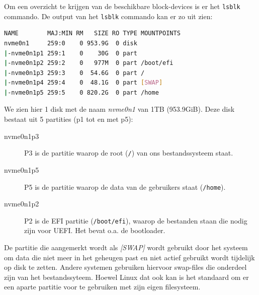 Om een overzicht te krijgen van de beschikbare block-devices is er het \texttt{lsblk} commando. De output van het \texttt{lsblk} commando kan er zo uit zien:
\begin{lstlisting}[language=bash]
NAME        MAJ:MIN RM   SIZE RO TYPE MOUNTPOINTS
nvme0n1     259:0    0 953.9G  0 disk 
|-nvme0n1p1 259:1    0    30G  0 part 
|-nvme0n1p2 259:2    0   977M  0 part /boot/efi
|-nvme0n1p3 259:3    0  54.6G  0 part /
|-nvme0n1p4 259:4    0  48.1G  0 part [SWAP]
|-nvme0n1p5 259:5    0 820.2G  0 part /home
\end{lstlisting}
We zien hier 1 disk met de naam \textit{nvme0n1} van 1TB (953.9GiB). Deze disk bestaat uit 5 partities (p1 tot en met p5):
\begin{description}
\item[nvme0n1p3] P3 is de partitie waarop de root (\texttt{/}) van ons bestandssysteem staat.
\item[nvme0n1p5] P5 is de partitie waarop de data van de gebruikers staat (\texttt{/home}).
\item[nvme0n1p2] P2 is de EFI partitie (\texttt{/boot/efi}), waarop de bestanden staan die nodig zijn voor UEFI. Het bevat o.a. de bootloader.
\end{description}

De partitie die aangemerkt wordt als \textit{[SWAP]} wordt gebruikt door het systeem om data die niet meer in het geheugen past en niet actief gebruikt wordt tijdelijk op disk te zetten. Andere systemen gebruiken hiervoor swap-files die onderdeel zijn van het bestandssyteem. Hoewel Linux dat ook kan is het standaard om er een aparte partitie voor te gebruiken met zijn eigen filesysteem.


